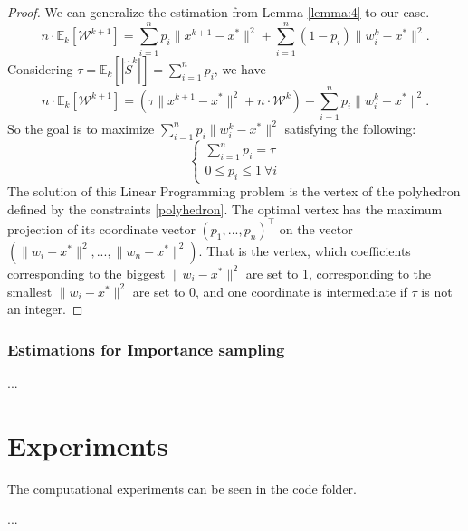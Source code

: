 \documentclass{article}
\theoremstyle{definition}
\theoremstyle{assumption}
\theoremstyle{lemma}
\theoremstyle{theorem}
\theoremstyle{proposition}
\begin{document}
	\begin{proof}
		We can generalize the estimation from Lemma \ref{lemma:4} to our case.
		\begin{equation}
			n \cdot \mathbb E_k[\mathcal W^{k+1}] = \sum \limits_{i=1}^n p_i  \| x^{k+1} - x^* \|^2 + \sum \limits_{i=1}^n \left(1 - p_i \right) \|w_i^k - x^*\|^2.
		\end{equation}
		Considering $\tau = \mathbb E_k[|\hat S^k|] = \sum \limits_{i=1}^n p_i$, we have
		\begin{equation}
			n \cdot \mathbb E_k[\mathcal W^{k+1}] = \left( \tau  \| x^{k+1} - x^* \|^2 + n \cdot \mathcal W^k \right) - \sum \limits_{i=1}^n p_i \|w_i^k - x^*\|^2.
		\end{equation}
		So the goal is to maximize $\sum \limits_{i=1}^n p_i \|w_i^k - x^*\|^2$ satisfying the following:
		\begin{equation} \label{polyhedron}
			\begin{cases}
			\sum \limits_{i=1}^n p_i = \tau \\
			0 \leqslant p_i \leqslant 1\ \forall i
			\end{cases}
		\end{equation}
		The solution of this Linear Programming problem is the vertex of the polyhedron defined by the constraints \ref{polyhedron}. The optimal vertex has the maximum projection of its coordinate vector $(p_1, ..., p_n)^\top$ on the vector $(\|w_i - x^*\|^2, ..., \|w_n - x^*\|^2)$. That is the vertex, which coefficients corresponding to the biggest $\|w_i - x^*\|^2$ are set to 1, corresponding to the smallest $\|w_i - x^*\|^2$ are set to 0, and one coordinate is intermediate if $\tau$ is not an integer.
	\end{proof}

	\subsubsection{Estimations for Importance sampling}

	...
	
	\section{Experiments}
	
	The computational experiments can be seen in the code folder.
	
	...
	
	
\renewcommand\refname{References}	


\end{document}
